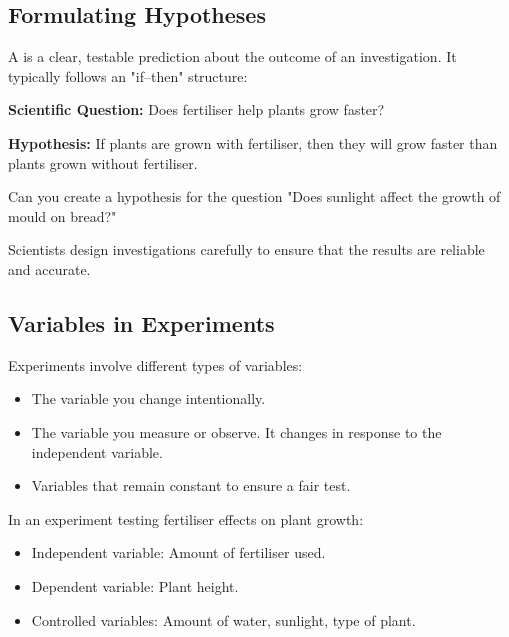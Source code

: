 
\subsection{Formulating Hypotheses}

A  is a clear, testable prediction about the outcome of an investigation. It typically follows an "if–then" structure:

\begin{example}
\textbf{Scientific Question:} Does fertiliser help plants grow faster?

\textbf{Hypothesis:} If plants are grown with fertiliser, then they will grow faster than plants grown without fertiliser.
\end{example}

\begin{stopandthink}
Can you create a hypothesis for the question "Does sunlight affect the growth of mould on bread?"
\end{stopandthink}

\FloatBarrier

Scientists design investigations carefully to ensure that the results are reliable and accurate.

\subsection{Variables in Experiments}

Experiments involve different types of variables:

\begin{itemize}
    \item {} The variable you change intentionally.
    \item {} The variable you measure or observe. It changes in response to the independent variable.
    \item {} Variables that remain constant to ensure a fair test.
\end{itemize}

\begin{example}
In an experiment testing fertiliser effects on plant growth:

\begin{itemize}
    \item Independent variable: Amount of fertiliser used.
    \item Dependent variable: Plant height.
    \item Controlled variables: Amount of water, sunlight, type of plant.
\end{itemize}
\end{example}

